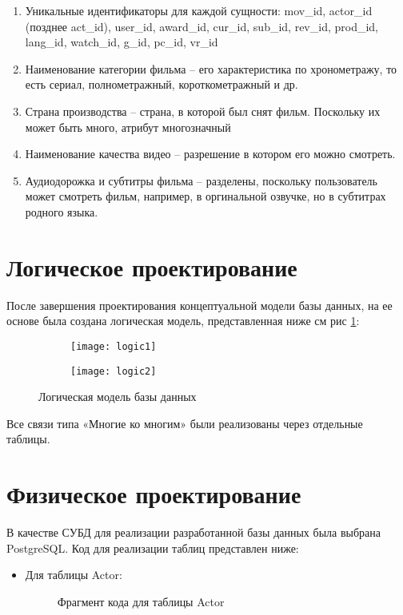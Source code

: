 \begin{enumerate}
\item Уникальные идентификаторы для каждой сущности: mov\_id, actor\_id (позднее act\_id), user\_id, award\_id, 
cur\_id, sub\_id, rev\_id, prod\_id, lang\_id, watch\_id, g\_id, pc\_id, vr\_id
\item Наименование категории фильма -- его характеристика по хронометражу, то есть сериал, полнометражный, короткометражный и др.
\item Страна производства -- страна, в которой был снят фильм. Поскольку их может быть много, атрибут многозначный
\item Наименование качества видео -- разрешение в котором его можно смотреть.
\item Аудиодорожка и субтитры фильма -- разделены, поскольку пользователь может смотреть фильм, например, в оргинальной озвучке,
    но в субтитрах родного языка.
\end{enumerate}

\section{Логическое проектирование}
После завершения проектирования концептуальной модели базы данных, на ее основе была создана логическая модель, 
представленная ниже {см рис \ref{logic}}:

\begin{figure}
    \begin{subfigure}{.5\linewidth}
    \texttt{[image: logic1]}
    \end{subfigure}

    \begin{subfigure}{.5\linewidth}
    \texttt{[image: logic2]}
    \end{subfigure}

    \caption{Логическая модель базы данных}
    \label{logic}
\end{figure}

Все связи типа «Многие ко многим» были реализованы через отдельные таблицы.

\section{Физическое проектирование}
В качестве СУБД для реализации разработанной базы данных была выбрана
PostgreSQL. Код для реализации таблиц представлен ниже:
\begin{itemize}
\item Для таблицы Actor:
\begin{figure} [h]
    \caption{Фрагмент кода для таблицы Actor}
\end{figure}
\end{itemize}


